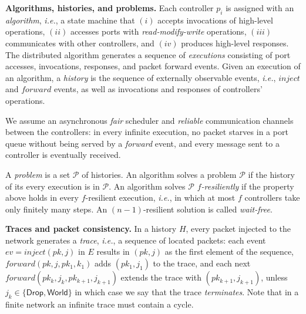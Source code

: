 \documentclass[11pt,pdftex,letter]{article}
\newcommand{\ie}{{\it i.e.}}
\newcommand{\mcnote}[1]{\textcolor{heraldBlue}{\small \bf [MC: #1]}}
\newcommand{\mcnote}[1]{}
\begin{document}
\vspace{1mm}\noindent\textbf{Algorithms, histories,  and problems.}
%
Each controller $p_i$ is assigned with an \emph{algorithm}, \ie, a state machine that
$(i)$ accepts invocations of high-level operations, $(ii)$ accesses ports with
\textit{read-modify-write} operations,
$(iii)$ communicates with other controllers, and $(iv)$ produces high-level responses.
The distributed algorithm generates a sequence of \emph{executions}
consisting of port accesses, invocations, responses, and packet forward events.
Given an execution of an algorithm, a \emph{history} is the sequence of externally observable events, \ie, $\textit{inject}$
and $\textit{forward}$ events, as well as
invocations and responses of controllers' operations.

We assume an asynchronous \emph{fair} scheduler and \emph{reliable} communication channels
between the controllers: in every infinite execution, no packet starves in a port queue without being
served by a \emph{forward} event, and
every message sent to a controller is eventually received.

A \emph{problem} is a set $\mathcal P$ of histories.
An algorithm solves a problem $\mathcal P$ if the history of its every
execution is in $\mathcal P$.
An algorithm solves $\mathcal P$ \emph{$f$-resiliently} if the property above holds in
every $f$-resilient execution, \ie, in which at most $f$ controllers
take only finitely many steps.
An $(n-1)$-resilient solution is called \emph{wait-free}.


\vspace{1mm}\noindent\textbf{Traces and packet consistency.}
In a history $H$, every packet injected to the network
generates a \emph{trace}, \ie, a sequence of located packets: each event
$ev=\textit{inject}(pk,j)$ in $E$ results in $(pk,j)$ as the first element of
the sequence, $\textit{forward}(pk,j,pk_1,k_1)$ 
adds $(pk_1,j_1)$ to the trace, 
and each next $\textit{forward}(pk_k,j_k,pk_{k+1},j_{k+1})$ extends
the trace with $(pk_{k+1},j_{k+1})$, unless
$j_k\in\{\textsf{Drop},\textsf{World}\}$ in which case we say that the
trace \emph{terminates}.
Note that in a finite network an infinite trace must contain a cycle.
\end{document}

